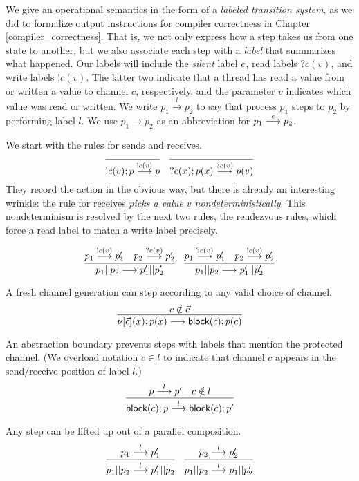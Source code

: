 \documentclass{amsbook}
\theoremstyle{definition}
\theoremstyle{remark}
\numberwithin{section}{chapter}
\numberwithin{equation}{chapter}
\begin{document}
\newcommand{\readl}[2]{?#1(#2)}
\newcommand{\writel}[2]{!#1(#2)}
\newcommand{\lts}[3]{#1 \stackrel{#2}{\longrightarrow} #3}
\newcommand{\ltsS}[3]{#1 \stackrel{#2}{\longrightarrow}^* #3}

\medskip

We give an operational semantics in the form of a \emph{labeled transition system}, as we did to formalize output instructions for compiler correctness in Chapter \ref{compiler_correctness}.
That is, we not only express how a step takes us from one state to another, but we also associate each step with a \emph{label} that summarizes what happened.
Our labels will include the \emph{silent} label $\epsilon$, read labels $\readl{c}{v}$, and write labels $\writel{c}{v}$.
The latter two indicate that a thread has read a value from or written a value to channel $c$, respectively, and the parameter $v$ indicates which value was read or written.
We write $\lts{p_1}{l}{p_2}$ to say that process $p_1$ steps to $p_2$ by performing label $l$.
We use $\lts{p_1}{}{p_2}$ as an abbreviation for $\lts{p_1}{\silent}{p_2}$.

We start with the rules for sends and receives.
$$\infer{\lts{\send{c}{v}{p}}{\writel{c}{v}}{p}}{}
\quad \infer{\lts{\recv{c}{x}{p(x)}}{\readl{c}{v}}{p(v)}}{}$$
They record the action in the obvious way, but there is already an interesting wrinkle: the rule for receives \emph{picks a value $v$ nondeterministically}.
This nondeterminism is resolved by the next two rules, the rendezvous rules, which force a read label to match a write label precisely.

$$\infer{\lts{\parl{p_1}{p_2}}{}{\parl{p'_1}{p'_2}}}{
  \lts{p_1}{\writel{c}{v}}{p'_1}
  & \lts{p_2}{\readl{c}{v}}{p'_2}
}
\quad \infer{\lts{\parl{p_1}{p_2}}{}{\parl{p'_1}{p'_2}}}{
  \lts{p_1}{\readl{c}{v}}{p'_1}
  & \lts{p_2}{\writel{c}{v}}{p'_2}
}$$

A fresh channel generation can step according to any valid choice of channel.
$$\infer{\lts{\newp{\vec c}{x}{p(x)}}{}{\block{c}{p(c)}}}{
  c \notin \vec c
}$$

An abstraction boundary prevents steps with labels that mention the protected channel.
(We overload notation $c \in l$ to indicate that channel $c$ appears in the send/receive position of label $l$.)
$$\infer{\lts{\block{c}{p}}{l}{\block{c}{p'}}}{
  \lts{p}{l}{p'}
  & c \notin l
}$$

Any step can be lifted up out of a parallel composition.
$$\infer{\lts{\parl{p_1}{p_2}}{l}{\parl{p'_1}{p_2}}}{
  \lts{p_1}{l}{p'_1}
}
\quad \infer{\lts{\parl{p_1}{p_2}}{l}{\parl{p_1}{p'_2}}}{
  \lts{p_2}{l}{p'_2}
}$$
\end{document}
